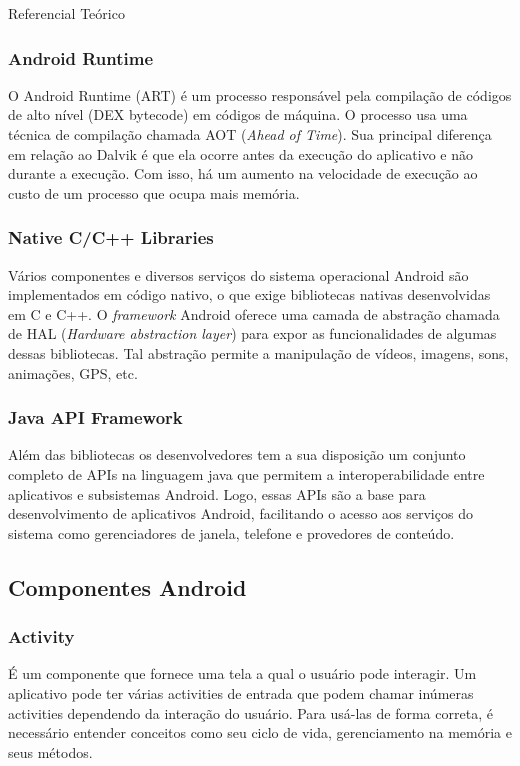 \documentclass[
	12pt,				%
	openany,			%
	twoside,			%
	a4paper,			%
	english,			%
	french,				%
	spanish,			%
	brazil				%
	]{abntex2}
\begin{document}
\begin{chapter}{Referencial Teórico}
\subsubsection{Android Runtime}
O Android Runtime (ART) é um processo responsável pela compilação de códigos de alto nível (DEX bytecode) em códigos de máquina.
O processo usa uma técnica de compilação chamada AOT (\textit{Ahead of Time}). Sua principal diferença em relação ao Dalvik é que ela ocorre antes 
da execução do aplicativo e não durante a execução. Com isso, há um aumento na velocidade de execução ao custo de um processo que ocupa mais memória.



\subsubsection{Native C/C++ Libraries}
Vários componentes e diversos serviços do sistema operacional Android são implementados em código nativo,
 o que exige bibliotecas nativas desenvolvidas em C e C++.
O \textit{framework} Android oferece uma camada de abstração chamada de HAL (\textit{Hardware abstraction layer}) para expor as funcionalidades de algumas dessas bibliotecas.
Tal abstração permite a manipulação de vídeos, imagens, sons, animações, GPS, etc.

\subsubsection{Java API Framework}
Além das bibliotecas os desenvolvedores tem a sua disposição um conjunto completo de APIs na linguagem java que permitem a interoperabilidade entre aplicativos e subsistemas Android. Logo, essas APIs são a base para desenvolvimento de aplicativos Android, facilitando o acesso aos serviços do sistema como gerenciadores de janela, telefone e provedores de conteúdo.

\subsection{Componentes Android}
\subsubsection{Activity}  \label{activity}
É um componente que fornece uma tela a qual o usuário pode interagir. Um aplicativo pode ter várias activities de entrada que podem chamar inúmeras activities dependendo da interação do usuário. Para usá-las de forma correta, é necessário entender conceitos como seu ciclo de vida, gerenciamento na memória e seus métodos. 


\end{chapter}
\end{document}
